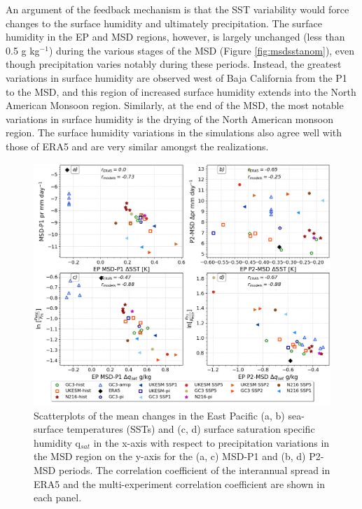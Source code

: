 An argument of the feedback mechanism is that the SST variability would force changes to the surface humidity and ultimately precipitation. The surface humidity in the EP and MSD regions, however, is largely unchanged (less than 0.5 g kg$^{-1}$) during the various stages of the MSD (Figure \ref{fig:msdsstanom}), even though precipitation varies notably during these periods. Instead, the greatest variations in surface humidity are observed west of Baja California from the P1 to the MSD, and this region of increased surface humidity extends into the North American Monsoon region. Similarly, at the end of the MSD, the most notable variations in surface humidity is the drying of the North American monsoon region.
 The surface humidity variations in the simulations also agree well with those of ERA5 and are very similar amongst the realizations.



\begin{figure}[t!]
\includegraphics[width=\linewidth]{figures/sst_scatter_f.png}
\caption[Scatter plot of SST changes]{Scatterplots of the mean changes in the East Pacific (a, b) sea-surface temperatures (SSTs) and (c, d) surface saturation specific humidity q$_{sat}$ in the x-axis with respect to precipitation variations in the MSD region on the y-axis for the (a, c) MSD-P1 and (b, d) P2-MSD periods.  The correlation coefficient of the interannual spread in ERA5 and the multi-experiment correlation coefficient are shown in each panel.   }
\label{fig:var_sst_lhf_scatter}
\end{figure}


